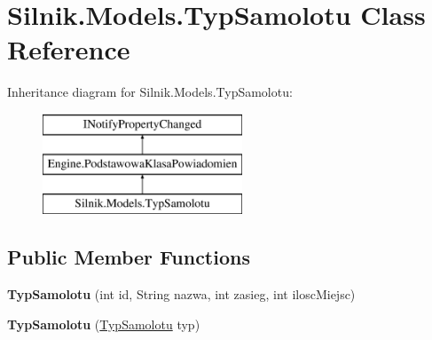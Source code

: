 \hypertarget{class_silnik_1_1_models_1_1_typ_samolotu}{}\section{Silnik.\+Models.\+Typ\+Samolotu Class Reference}
\label{class_silnik_1_1_models_1_1_typ_samolotu}
Inheritance diagram for Silnik.\+Models.\+Typ\+Samolotu\+:\begin{figure}[H]
\begin{center}
\leavevmode
\includegraphics[height=3.000000cm]{class_silnik_1_1_models_1_1_typ_samolotu}
\end{center}
\end{figure}
\subsection*{Public Member Functions}
\begin{DoxyCompactItemize}
\item 
\mbox{\label{class_silnik_1_1_models_1_1_typ_samolotu_ab338c993c75b09a7608efe91a6374b39}} 
{\bfseries Typ\+Samolotu} (int id, String nazwa, int zasieg, int ilosc\+Miejsc)
\item 
\mbox{\label{class_silnik_1_1_models_1_1_typ_samolotu_a976ba346e05a686ec822ad0700053a79}} 
{\bfseries Typ\+Samolotu} (\mbox{\hyperlink{class_silnik_1_1_models_1_1_typ_samolotu}{Typ\+Samolotu}} typ)
\end{DoxyCompactItemize}
